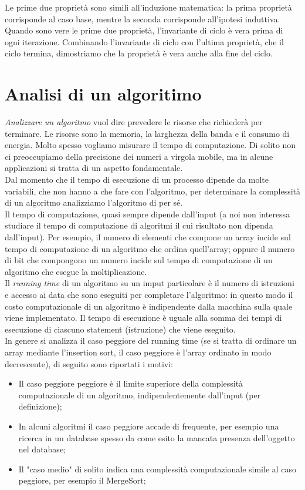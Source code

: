 \documentclass{article}
\begin{document}
Le prime due proprietà sono simili all'induzione matematica: la prima proprietà
corrisponde al caso base, mentre la seconda corrisponde all'ipotesi induttiva. Quando
sono vere le prime due proprietà, l'invariante di ciclo è vera prima di ogni
iterazione. Combinando l'invariante di ciclo con l'ultima proprietà, che il
ciclo termina, dimostriamo che la proprietà è vera anche alla fine del ciclo.

\section{Analisi di un algoritimo}
\textit{Analizzare un algoritmo} vuol dire prevedere le risorse che richiederà
per terminare. Le risorse sono la memoria, la larghezza della banda e il 
consumo di energia. Molto spesso vogliamo misurare il tempo di computazione. 
Di solito non ci preoccupiamo della precisione dei numeri a virgola mobile, 
ma in alcune applicazioni si tratta di un aspetto fondamentale.\\

Dal momento che il tempo di esecuzione di un processo dipende da molte variabili,
che non hanno a che fare con l'algoritmo, per determinare la complessità
di un algoritmo analizziamo l'algoritmo di per sé.\\
Il tempo di computazione, quasi sempre dipende dall'input (a noi non interessa
studiare il tempo di computazione di algoritmi il cui risultato non dipenda
dall'input). Per esempio, il numero di elementi che compone un array incide sul tempo di computazione di un
algoritmo che ordina quell'array; oppure il numero di bit che compongono un
numero incide sul tempo di computazione di un algoritmo che esegue la
moltiplicazione.\\
Il \textit{running time} di un algoritmo su un imput particolare è il numero di
istruzioni e accesso ai data che sono eseguiti per completare l'algoritmo: in
questo modo il costo computazionale di un algoritmo è indipendente dalla
macchina sulla quale viene implementato.
Il tempo di esecuzione è uguale alla somma dei tempi di esecuzione di ciascuno
statement (istruzione) che viene eseguito.\\
In genere si analizza il caso peggiore del running time (se si tratta di
ordinare un array mediante l'insertion sort, il caso peggiore è l'array ordinato
in modo decrescente), di seguito sono riportati i motivi:
\begin{itemize}
    \item Il caso peggiore peggiore è il limite superiore della complessità
        computazionale di un algoritmo, indipendentemente dall'input (per
        definizione);
    \item In alcuni algoritmi il caso peggiore accade di frequente, per esempio
        una ricerca in un database spesso da come esito la mancata
        presenza dell'oggetto nel database;
    \item Il "caso medio" di solito indica una complessità computazionale simile
        al caso peggiore, per esempio il MergeSort;
\end{itemize}
\end{document}
